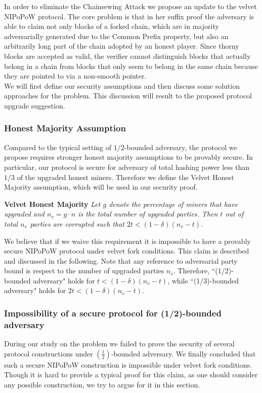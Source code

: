 In order to eliminate the Chainsewing Attack we propose an update to the velvet
NIPoPoW protocol. The core problem is that in her suffix proof the adversary
is able to claim not only blocks of a forked chain,  which are in majority adversarially
generated due to the Common Prefix property, but also an arbitrarily long part of the
chain adopted by an honest player. Since thorny blocks are accepted as valid,
the verifier cannot distinguish blocks that actually belong in a chain from
blocks that only seem to belong in the same chain because they are pointed to
via a non-smooth pointer. \\

We will first define our security assumptions and then discuss some solution
approaches for the problem. This discussion will result to the proposed protocol
upgrade suggestion.

\subsubsection{Honest Majority Assumption}
Compared to the typical setting of $1/2$-bounded adversary, the protocol we
propose requires stronger honest majority assumptions to be provably secure. 
In particular, our protocol is secure for adversary of total hashing power 
less than $1/3$ of the upgraded honest miners. Therefore we define the Velvet
Honest Majority assumption, which will be used in our security proof.

\begin{defn}{\textbf{Velvet Honest Majority}}
	\textit{Let $g$ denote the percentage of miners that have upgraded and $n_v = g
	\cdot n$ is the total number of upgraded parties. Then $t$ out of total $n_v$
	parties are corrupted such that $2t < (1 - \delta)(n_v-t)$. }
	\label{defn:smooth_pointer}
\end{defn}
We believe that if we waive this requirement it is impossible to have a provably 
secure NIPoPoW protocol under velvet fork conditions.
This claim is described and discussed in the following.
Note that any reference to adversarial party bound is respect to the number of
upgraded parties $n_v$. Therefore, ``(1/2)-bounded adversary" holds for
$t < (1 - \delta)(n_v - t)$, while ``(1/3)-bounded adversary" holds for
$2t < (1 - \delta)(n_v - t)$.

\subsubsection{Impossibility of a secure protocol for (1/2)-bounded adversary}
During our study on the problem we failed to prove the security of several protocol
constructions under $(\frac{1}{2})$-bounded adversary. We finally concluded that
such a secure NIPoPoW construction is impossible under velvet fork conditions.
Though it is hard to provide a typical proof for this claim, as one should consider
any possible construction, we try to argue for it in this section.

